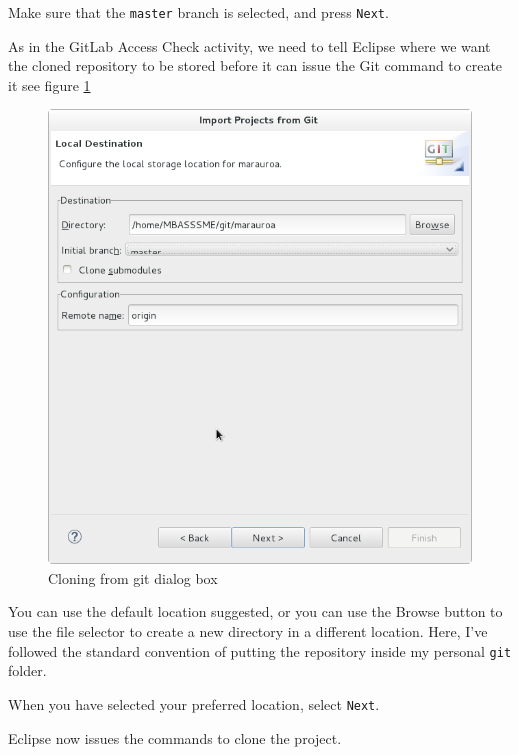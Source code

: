 \documentclass[
]{book}
\begin{document}
Make sure that the \texttt{master} branch is selected, and press \texttt{Next}.

As in the GitLab Access Check activity, we need to tell Eclipse where we want the cloned repository to be stored before it can issue the Git command to create it see figure \ref{fig:configureLocalStorageMarauroa-fig}

\begin{figure}

{\centering \includegraphics[width=1\linewidth]{images/1.4configureLocalStorageMarauroa} 

}

\caption{Cloning from git dialog box}\label{fig:configureLocalStorageMarauroa-fig}
\end{figure}

You can use the default location suggested, or you can use the Browse button to use the file selector to create a new directory in a different location. Here, I've followed the standard convention of putting the repository inside my personal \texttt{git} folder.

When you have selected your preferred location, select \texttt{Next}.

Eclipse now issues the commands to clone the project.
\end{document}
